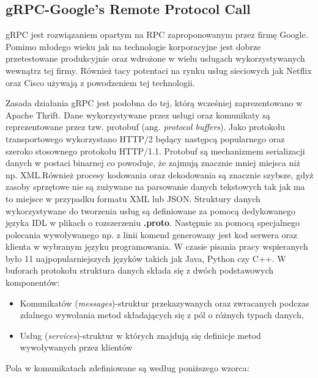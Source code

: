 \subsection{gRPC-Google's Remote Protocol Call}
gRPC jest rozwiązaniem opartym na RPC zaproponowanym przez firmę Google. Pomimo młodego wieku jak na technologie korporacyjne jest dobrze przetestowane produkcyjnie oraz wdrożone w wielu usługach wykorzystywanych wewnątrz tej firmy. Również tacy potentaci na rynku usług sieciowych jak Netflix oraz Cisco używają z powodzeniem tej technologii.
\par Zasada działania gRPC jest podobna do tej, którą wcześniej zaprezentowano w Apache Thrift. Dane wykorzystywane przez usługi oraz komunikaty są reprezentowane przez tzw. protobuf (ang. \textit{protocol buffers}). Jako protokołu transportowego wykorzystano HTTP/2 będący następcą popularnego oraz szeroko stosownego protokołu HTTP/1.1. Protobuf są mechanizmem serializacji danych w postaci binarnej co powoduje, że zajmują znacznie mniej miejsca niż np. XML.\@ Również procesy kodowania oraz dekodowania są znacznie szybsze, gdyż zasoby sprzętowe nie są zużywane na parsowanie danych tekstowych tak jak ma to miejsce w przypadku formatu XML lub JSON. Struktury danych wykorzystywane do tworzenia usług są definiowane za pomocą dedykowanego języka IDL w plikach o rozszerzeniu \textbf{.proto}. Następnie za pomocą specjalnego polecania wywoływanego np. z linii komend generowany jest kod serwera oraz klienta w wybranym języku programowania. W czasie pisania pracy wspieranych było 11 najpopularniejszych języków takich jak Java, Python czy C++. W buforach protokołu struktura danych składa się z dwóch podstawowych komponentów: 
\begin{itemize}
  \item Komunikatów (\textit{messages})-struktur przekazywanych oraz zwracanych podczas zdalnego wywołania metod składających się z pól o różnych typach danych,
  \item Usług (\textit{services})-struktur w których znajdują się definicje metod wywoływanych przez klientów
\end{itemize}
\noindent
Pola w komunikatach zdefiniowane są według poniższego wzorca:

